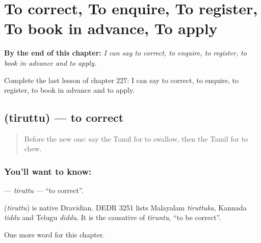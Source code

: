 
\chapter{To correct, To enquire, To register, To book in advance, To apply}
\label{ch:ta-to-correct-to-enquire-to-register-to-book-in-advance-to-apply}

\begin{chapteropening}
\textbf{By the end of this chapter:} \emph{I can say to correct, to enquire, to register, to book in advance and to apply.}

Complete the last lesson of chapter 227: I can say to correct, to enquire, to register, to book in advance and to apply.
\end{chapteropening}

\section[\texorpdfstring{\ta{திருத்து} (tiruttu)}{திருத்து (tiruttu)}]{ (tiruttu) — to correct}

\label{lesson:TA-C227-tiruttu}



\begin{quote}
Before the new one: say the Tamil for to swallow, then the Tamil for to chew.
\end{quote}

\subsection*{You'll want to know: }
\textbf{} — \emph{tiruttu} — \textquotedblleft{}to correct\textquotedblright{}.

\begin{cousinweb}
\textbf{} (\emph{tiruttu}) is native Dravidian. DEDR 3251 lists Malayalam \emph{tiruttuka}, Kannada \emph{tiddu} and Telugu \emph{diddu}. It is the causative of \emph{tiruntu}, \textquotedblleft{}to be correct\textquotedblright{}.
\end{cousinweb}

\begin{grammarlens}[title={What you've built}]
One more word for this chapter.
\end{grammarlens}

